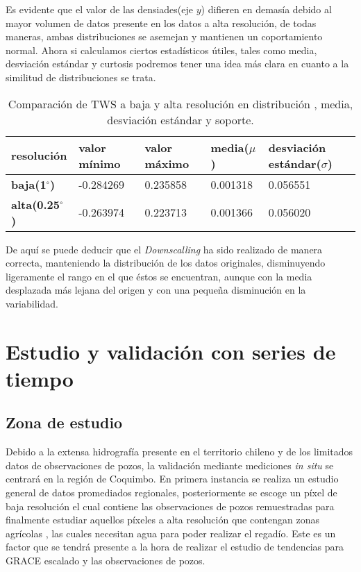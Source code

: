 Es evidente que el valor de las densiades(eje $y$) difieren en demasía debido al mayor volumen de datos presente en los datos a alta resolución, de todas maneras, ambas distribuciones
se asemejan y mantienen un coportamiento normal. Ahora si calculamos ciertos estadísticos útiles, tales como media, desviación estándar y curtosis podremos tener una idea más clara 
en cuanto a la similitud de distribuciones se trata.

\begin{table}[H] 
    \caption[Comparación de distribuciones de TWS a baja y alta resolución]{Comparación de TWS a baja y alta resolución en distribución , media, desviación estándar y soporte.}
    \begin{tabularx}{0.9\textwidth}{CCCCC}
    \toprule
    \textbf{resolución}	& \textbf{valor mínimo}	& \textbf{valor máximo} & \textbf{media($\mu$)} & \textbf{desviación estándar($\sigma$)}\\
        \midrule
        \textbf{baja(1$^{\circ}$)}		& -0.284269 & 0.235858 & 0.001318 & 0.056551\\
        \textbf{alta(0.25$^{\circ}$)}   & -0.263974 & 0.223713	& 0.001366 & 0.056020\\
        \bottomrule
    \end{tabularx}
\end{table}

De aquí se puede deducir que el \textit{Downscalling} ha sido realizado de manera correcta, manteniendo la distribución de los datos originales, disminuyendo ligeramente el rango en el que éstos se encuentran,
aunque con la media desplazada más lejana del origen y con una pequeña disminución en la variabilidad.


%
%
%
%


\section{Estudio y validación con series de tiempo}

\subsection{Zona de estudio}

Debido a la extensa hidrografía presente en el territorio chileno y de los limitados datos de observaciones de pozos, la validación mediante mediciones \textit{in situ} se centrará
en la región de Coquimbo. En primera instancia se realiza un estudio general de datos promediados regionales, 
posteriormente se escoge un píxel de baja resolución el cual contiene las observaciones de pozos remuestradas para finalmente estudiar aquellos píxeles a alta resolución que contengan zonas agrícolas \cite{LC}, las cuales necesitan agua para 
poder realizar el regadío. Este es un factor que se tendrá presente a la hora de realizar el estudio de tendencias para GRACE escalado y las observaciones de pozos.

